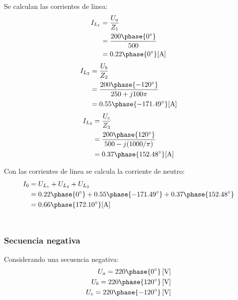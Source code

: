 \documentclass[letter,11pt]{article}
\begin{document}
Se calculan las corrientes de linea:
\begin{equation*}
    \begin{split}
        I_{L_1} &= \frac{U_a}{Z_1}\\
                &= \frac{200\phase{0^{\circ}}}{500}\\
                &= 0.22\phase{0^{\circ}}[\text{A}]\\
    \end{split}
\end{equation*}
\begin{equation*}
    \begin{split}
        I_{L_2} &= \frac{U_b}{Z_2}\\
                &= \frac{200\phase{-120^{\circ}}}{250+j100\pi}\\
                &= 0.55\phase{-171.49^{\circ}}[\text{A}]\\
    \end{split}
\end{equation*}
\begin{equation*}
    \begin{split}
        I_{L_3} &= \frac{U_c}{Z_3}\\
                &= \frac{200\phase{120^{\circ}}}{500-j(1000/\pi)}\\
                &= 0.37\phase{152.48^{\circ}}[\text{A}]\\
    \end{split}
\end{equation*}

Con las corrientes de linea se calcula la corriente de neutro:
\begin{equation*}
    \begin{split}
        I_0 &= U_{L_1}+U_{L_2}+U_{L_3}\\
            &= 0.22\phase{0^{\circ}}+0.55\phase{-171.49^{\circ}}+0.37\phase{152.48^{\circ}}\\
            &= 0.66\phase{172.10^{\circ}}[\text{A}]\\
    \end{split}
\end{equation*}
\\

\subsubsection{Secuencia negativa}
Considerando una secuencia negativa:
\begin{equation*}
    \begin{split}
        U_a = 220\phase{0^{\circ}}\,[\text{V}]\\
        U_b = 220\phase{120^{\circ}}\,[\text{V}]\\
        U_c = 220\phase{-120^{\circ}}\,[\text{V}]\\
    \end{split}
\end{equation*}
\end{document}
